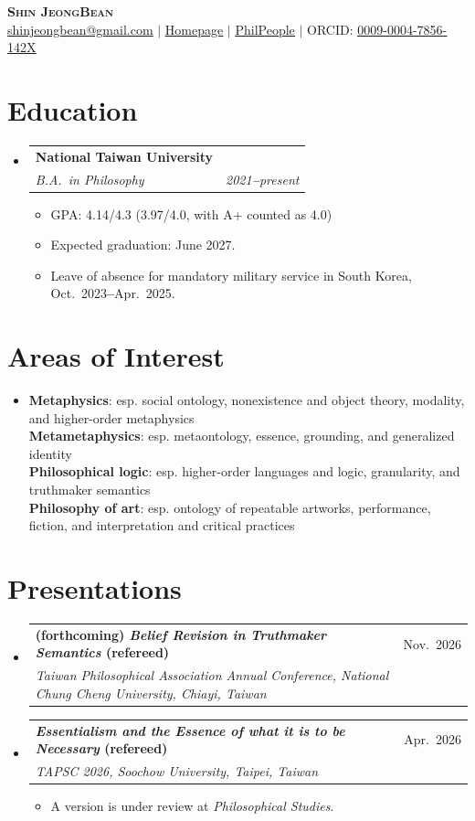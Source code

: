 \documentclass[letterpaper,11pt]{article}
\makeatletter
\newcommand{\resumeItem}[1]{
  \item\small{
    {#1 \vspace{-2pt}}
  }
}
\newcommand{\resumeSubheading}[4]{
  \vspace{-2pt}\item
    \begin{tabular*}{0.97\textwidth}[t]{l@{\extracolsep{\fill}}r}
      \textbf{#1} & #2 \\
      \textit{\small#3} & \textit{\small #4} \\
    \end{tabular*}\vspace{-7pt}
}
\newcommand{\resumeSubHeadingListStart}{\begin{itemize}[leftmargin=0.15in, label={}]}
\newcommand{\resumeSubHeadingListEnd}{\end{itemize}}
\newcommand{\resumeItemListStart}{\begin{itemize}}
\newcommand{\resumeItemListEnd}{\end{itemize}\vspace{-5pt}}
\makeatother
\begin{document}
\begin{center}
    \textbf{\Huge \scshape Shin JeongBean} \\ \vspace{1pt}
    \small
    \href{mailto:shinjeongbean@gmail.com}{\underline{shinjeongbean@gmail.com}} $|$
    \href{https://citron2357.github.io}{\underline{Homepage}} $|$
    \href{https://philpeople.org/profiles/jeongbean-shin}{\underline{PhilPeople}} $|$
    ORCID: \href{https://orcid.org/0009-0004-7856-142X}{\underline{0009-0004-7856-142X}}
\end{center}


\section{Education}
  \resumeSubHeadingListStart
    \resumeSubheading
      {National Taiwan University}{}
      {B.A.\ in Philosophy}{2021\textbf{--}present}
      \resumeItemListStart
        \resumeItem{GPA: 4.14/4.3 (3.97/4.0, with A+ counted as 4.0)}
        \resumeItem{Expected graduation: June 2027.}
        \resumeItem{Leave of absence for mandatory military service in South Korea, Oct.\ 2023\textbf{--}Apr.\ 2025.}
      \resumeItemListEnd
  \resumeSubHeadingListEnd


\section{Areas of Interest}
 \begin{itemize}[leftmargin=0.15in, label={}]
    \item{\textbf{Metaphysics}: {\small esp. social ontology, nonexistence and object theory, modality, and higher-order metaphysics}} \\
    \textbf{Metametaphysics}: {\small esp. metaontology, essence, grounding, and generalized identity} \\
    \textbf{Philosophical logic}: {\small esp. higher-order languages and logic, granularity, and truthmaker semantics} \\
    \textbf{Philosophy of art}: {\small esp. ontology of repeatable artworks, performance, fiction, and interpretation and critical practices}
 \end{itemize}


\section{Presentations}
  \resumeSubHeadingListStart
    \resumeSubheading
      {(forthcoming) \emph{Belief Revision in Truthmaker Semantics} (refereed)}{Nov.\ 2026}
      {Taiwan Philosophical Association Annual Conference, National Chung Cheng University, Chiayi, Taiwan}{}
    \resumeSubheading
      {\emph{Essentialism and the Essence of what it is to be Necessary} (refereed)}{Apr.\ 2026}
      {TAPSC 2026, Soochow University, Taipei, Taiwan}{}
      \resumeItemListStart
        \resumeItem{A version is under review at \emph{Philosophical Studies}.}
      \resumeItemListEnd
  \resumeSubHeadingListEnd
\end{document}
